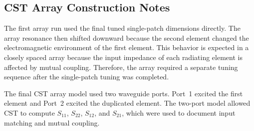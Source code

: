 \subsection{CST Array Construction Notes}

The first array run used the final tuned single-patch dimensions directly.  The array resonance then
shifted downward because the second element changed the electromagnetic environment of the first
element.  This behavior is expected in a closely spaced array because the input impedance of each
radiating element is affected by mutual coupling.  Therefore, the array required a separate tuning
sequence after the single-patch tuning was completed.

The final CST array model used two waveguide ports.  Port~1 excited the first element and Port~2
excited the duplicated element.  The two-port model allowed CST to compute \(S_{11}\), \(S_{22}\),
\(S_{12}\), and \(S_{21}\), which were used to document input matching and mutual coupling.
